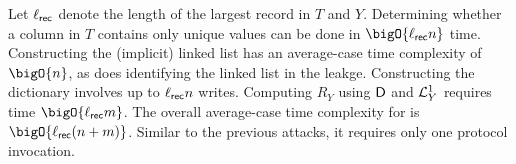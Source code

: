  Let \(\ell_{\mathsf{rec}}\) denote the length of
the largest record in \(T\) and \(Y\). Determining whether a column in \(T\)
contains only unique values can be done in $\bigO{\ell_{\rec} n}$ time.
Constructing the (implicit) linked list has an average-case time complexity of
\(\bigO{n}\), as does identifying the linked list in the leakge.  Constructing
the dictionary involves up to \(\ell_{\mathsf{rec}} n\) writes. Computing $R_Y$ using
$\mathsf{D}$ and $\mathcal{L}^{1}_Y$ requires time $\bigO{\ell_{\rec} m}$. The overall
average-case time complexity for \snakeattack{} is
\(\bigO{\ell_{\rec} (n + m)}\). Similar to the previous attacks, it requires
only one protocol invocation.
